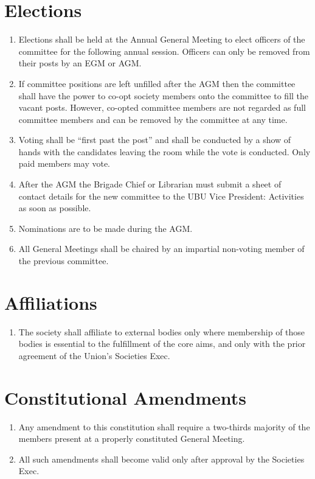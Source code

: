 \documentclass[a4paper,10pt]{article}
\begin{document}
\section{Elections}
\begin{enumerate}
  \item Elections shall be held at the Annual General Meeting to elect officers of the committee for the following annual session. Officers can only be removed from their posts by an EGM or AGM.
  \item If committee positions are left unfilled after the AGM then the committee shall have the power to co-opt society members onto the committee to fill the vacant posts. However, co-opted committee members are not regarded as full committee members and can be removed by the committee at any time.
  \item Voting shall be “first past the post” and shall be conducted by a show of hands with the candidates leaving the room while the vote is conducted. Only paid members may vote.
  \item After the AGM the Brigade Chief or Librarian must submit a sheet of contact details for the new committee to the UBU Vice President: Activities as soon as possible.
  \item Nominations are to be made during the AGM.
  \item All General Meetings shall be chaired by an impartial non-voting member of the previous committee.
\end{enumerate}

\section{Affiliations}
\begin{enumerate}
  \item The society shall affiliate to external bodies only where membership of those bodies is essential to the fulfillment of the core aims, and only with the prior agreement of the Union's Societies Exec.
\end{enumerate}

\section{Constitutional Amendments}
\begin{enumerate}
  \item Any amendment to this constitution shall require a two-thirds majority of the members present at a properly constituted General Meeting.
  \item All such amendments shall become valid only after approval by the Societies Exec.
\end{enumerate}
\end{document}
